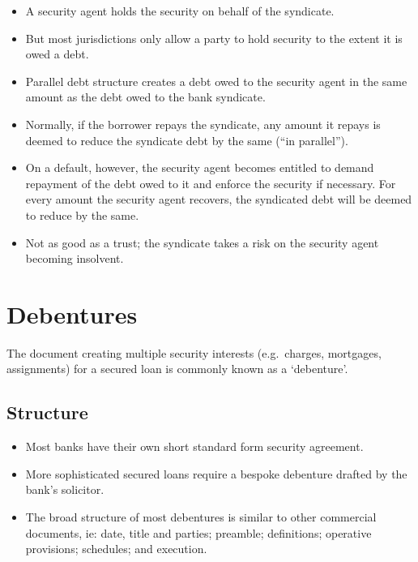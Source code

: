 \documentclass[
]{article}
\providecommand{\tightlist}{%
  \setlength{\itemsep}{0pt}\setlength{\parskip}{0pt}}
\begin{document}
\begin{itemize}
\begin{itemize}
    \begin{itemize}
    \tightlist
    \item
      A security agent holds the security on behalf of the syndicate.
    \item
      But most jurisdictions only allow a party to hold security to the
      extent it is owed a debt.
    \item
      Parallel debt structure creates a debt owed to the security agent
      in the same amount as the debt owed to the bank syndicate.
    \item
      Normally, if the borrower repays the syndicate, any amount it
      repays is deemed to reduce the syndicate debt by the same (``in
      parallel'').
    \item
      On a default, however, the security agent becomes entitled to
      demand repayment of the debt owed to it and enforce the security
      if necessary. For every amount the security agent recovers, the
      syndicated debt will be deemed to reduce by the same.
    \item
      Not as good as a trust; the syndicate takes a risk on the security
      agent becoming insolvent.
    \end{itemize}
  \end{itemize}
\end{itemize}

\hypertarget{debentures}{%
\section{Debentures}\label{debentures}}

The document creating multiple security interests (e.g.~charges,
mortgages, assignments) for a secured loan is commonly known as a
`debenture'.

\hypertarget{structure}{%
\subsection{Structure}\label{structure}}

\begin{itemize}
\tightlist
\item
  Most banks have their own short standard form security agreement.
\item
  More sophisticated secured loans require a bespoke debenture drafted
  by the bank's solicitor.
\item
  The broad structure of most debentures is similar to other commercial
  documents, ie: date, title and parties; preamble; definitions;
  operative provisions; schedules; and execution.
\end{itemize}
\end{document}
